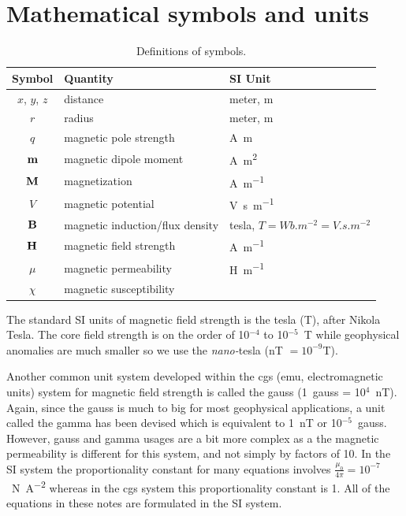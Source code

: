 \section{Mathematical symbols and units}

\begin{table}[hbt]
    \caption{Definitions of symbols.\vspace{2pt}}
    \label{tab:gravsym}
    \begin{tabular*}{\textwidth}{@{\extracolsep{\fill}}cll}
        \toprule
        Symbol &
        Quantity &
        SI Unit \\
        \midrule
        $x$, $y$, $z$   & distance                          & meter, \si{m} \\
        $r$             & radius                            & meter, \si{m} \\
        $q$             & magnetic pole strength            & \si{A.m} \\
        $\vb{m}$      & magnetic dipole moment            & \si{A.m^{2}} \\
        $\vb{M}$      & magnetization                     & \si{A.m^{-1}} \\
        $V$             & magnetic potential                & \si{V.s.m^{-1}} \\
        $\vb{B}$      & magnetic induction/flux density   & tesla,
            $\si{T} = \si{Wb.m^{-2}} = \si{V.s.m^{-2}}$ \\
        $\vb{H}$      & magnetic field strength           & \si{A.m^{-1}} \\
        $\mu$           & magnetic permeability             & \si{H.m^{-1}} \\
        $\chi$          & magnetic susceptibility           & \\
        \bottomrule
    \end{tabular*}
\end{table}

The standard SI units of magnetic field strength is the tesla (T), after Nikola Tesla.  The core field strength is on the order of 10$^{-4}$ to 10$^{-5}$~\si{T} while geophysical anomalies are much smaller so we use the \textit{nano-}tesla (nT $= 10^{-9}$\si{T}).

Another common unit system developed within the cgs (emu, electromagnetic units) system for magnetic field strength is called the gauss (\SI{1}{gauss} = 10$^{4}$~\si{nT}).  Again, since the gauss is much to big for most geophysical applications, a unit called the gamma has been devised which is equivalent to 1~nT or 10$^{-5}$~\si{gauss}.  However, gauss and gamma usages are a bit more complex as a the magnetic permeability is different for this system, and not simply by factors of 10.  In the SI system the proportionality constant for many equations involves $\frac{\mu_0}{4\pi} = 10^{-7}$~\si{N.A^{-2}} whereas in the cgs system this proportionality constant is 1.  All of the equations in these notes are formulated in the SI system.


